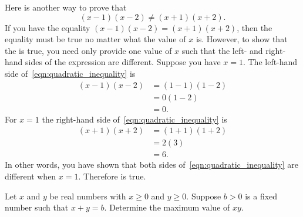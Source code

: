 \documentclass[a4paper,oneside,12pt]{article}
\begin{document}
\begin{problem}
{\begin{solution}
Here is another way to prove that
\begin{equation}
\label{eqn:quadratic_inequality}
(x - 1)(x - 2)
\neq
(x + 1)(x + 2).
\end{equation}
If you have the equality $(x - 1)(x - 2) = (x + 1)(x + 2)$, then the
equality must be true no matter what the value of $x$ is.  However, to
show that the  is true, you need
only provide one value of $x$ such that the left- and right-hand sides
of the expression are different.  Suppose you have $x = 1$.  The
left-hand side of~\eqref{eqn:quadratic_inequality} is
\begin{align*}
(x - 1)(x - 2)
&=
(1 - 1)(1 - 2) \\[4pt]
&=
0(1 - 2) \\[4pt]
&=
0.
\end{align*}
For $x = 1$ the right-hand side of~\eqref{eqn:quadratic_inequality} is
\begin{align*}
(x + 1)(x + 2)
&=
(1 + 1)(1 + 2) \\[4pt]
&=
2(3) \\[4pt]
&=
6.
\end{align*}
In other words, you have shown that both sides
of~\eqref{eqn:quadratic_inequality} are different when $x = 1$.
Therefore  is true.
\end{solution}
}{}

\item Let $x$ and $y$ be real numbers with $x \geq 0$ and $y \geq 0$.
  Suppose $b > 0$ is a fixed number such that $x + y = b$.  Determine
  the maximum value of $xy$.


\end{problem}
\end{document}
